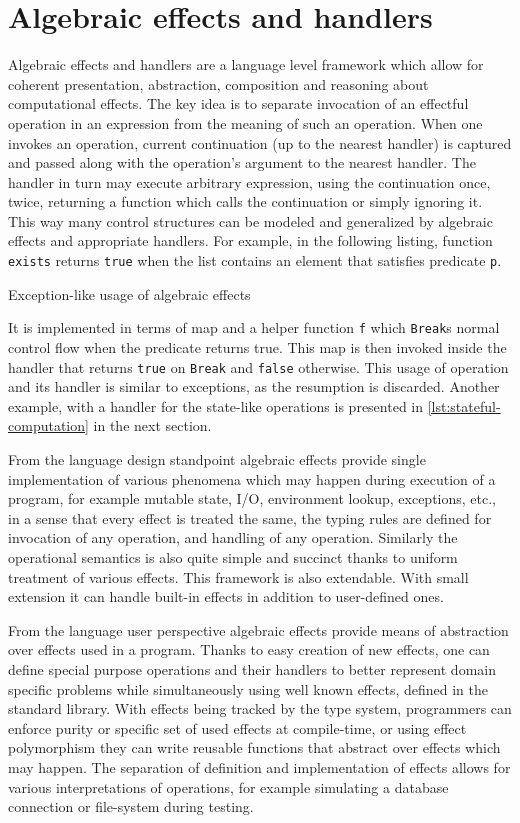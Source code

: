 \documentclass[inz, english, shortabstract]{iithesis}
\begin{document}
\section{Algebraic effects and handlers}
Algebraic effects and handlers are a language level framework which allow for coherent presentation, abstraction, composition and reasoning about computational effects.
The key idea is to separate invocation of an effectful operation in an expression from the meaning of such an operation.
When one invokes an operation, current continuation (up to the nearest handler) is captured and passed along with the operation's argument to the nearest handler.
The handler in turn may execute arbitrary expression, using the continuation once, twice, returning a function which calls the continuation or simply ignoring it.
This way many control structures can be modeled and generalized by algebraic effects and appropriate handlers.
For example, in the following listing, function \texttt{exists} returns \texttt{true} when the list contains an element that satisfies predicate \texttt{p}.
\begin{listing}[H]
  \caption{Exception-like usage of algebraic effects}
\end{listing}
It is implemented in terms of map and a helper function \texttt{f} which \texttt{Break}s normal control flow when the predicate returns true.
This map is then invoked inside the handler that returns \texttt{true} on \texttt{Break} and \texttt{false} otherwise.
This usage of operation and its handler is similar to exceptions, as the resumption is discarded.
Another example, with a handler for the state-like operations is presented in \autoref{lst:stateful-computation} in the next section.

From the language design standpoint algebraic effects provide single implementation of various phenomena which may happen during execution of a program, for example mutable state, I/O, environment lookup, exceptions, etc., in a sense that every effect is treated the same, the typing rules are defined for invocation of any operation, and handling of any operation.
Similarly the operational semantics is also quite simple and succinct thanks to uniform treatment of various effects.
This framework is also extendable.
With small extension it can handle built-in effects in addition to user-defined ones.

From the language user perspective algebraic effects provide means of abstraction over effects used in a program.
Thanks to easy creation of new effects, one can define special purpose operations and their handlers to better represent domain specific problems while simultaneously using well known effects, defined in the standard library.
With effects being tracked by the type system, programmers can enforce purity or specific set of used effects at compile-time, or using effect polymorphism they can write reusable functions that abstract over effects which may happen.
The separation of definition and implementation of effects allows for various interpretations of operations, for example simulating a database connection or file-system during testing.
\end{document}
